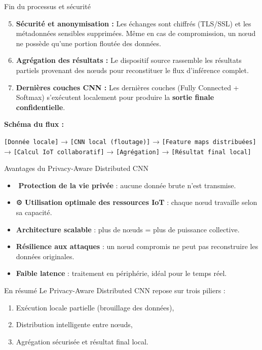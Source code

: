 \documentclass{beamer}
\begin{document}
\begin{frame}{Fin du processus et sécurité}
\begin{enumerate}
    \setcounter{enumi}{4}
    \item \textbf{Sécurité et anonymisation :}  
    Les échanges sont chiffrés (TLS/SSL) et les métadonnées sensibles supprimées.  
    Même en cas de compromission, un nœud ne possède qu’une portion floutée des données.

    \item \textbf{Agrégation des résultats :}  
    Le dispositif source rassemble les résultats partiels provenant des nœuds pour reconstituer le flux d’inférence complet.

    \item \textbf{Dernières couches CNN :}  
    Les dernières couches (Fully Connected + Softmax) s’exécutent localement pour produire la \textbf{sortie finale confidentielle}.
\end{enumerate}

\vspace{0.4cm}
\textbf{Schéma du flux :}
\begin{center}
\scriptsize
\texttt{[Donnée locale]} → \texttt{[CNN local (floutage)]} → \texttt{[Feature maps distribuées]} → \texttt{[Calcul IoT collaboratif]} → \texttt{[Agrégation]} → \texttt{[Résultat final local]}
\end{center}
\end{frame}

\begin{frame}{Avantages du Privacy-Aware Distributed CNN}
\begin{itemize}
    \item ️ \textbf{Protection de la vie privée} : aucune donnée brute n’est transmise.
    \item ⚙️ \textbf{Utilisation optimale des ressources IoT} : chaque nœud travaille selon sa capacité.
    \item  \textbf{Architecture scalable} : plus de nœuds = plus de puissance collective.
    \item  \textbf{Résilience aux attaques} : un nœud compromis ne peut pas reconstruire les données originales.
    \item  \textbf{Faible latence} : traitement en périphérie, idéal pour le temps réel.
\end{itemize}

\vspace{0.4cm}
\begin{block}{En résumé}
Le Privacy-Aware Distributed CNN repose sur trois piliers :
\begin{enumerate}
    \item Exécution locale partielle (brouillage des données),
    \item Distribution intelligente entre nœuds,
    \item Agrégation sécurisée et résultat final local.
\end{enumerate}
\end{block}
\end{frame}
\end{document}
